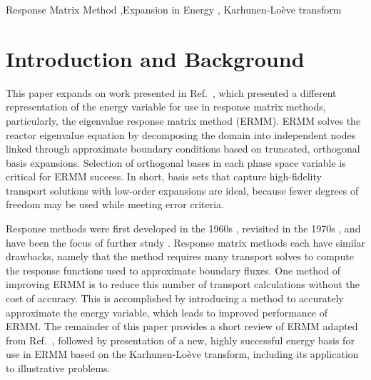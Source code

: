 \documentclass[5p,times,twocolumn,10pt]{elsarticle}
\newcommand{\REF}[1]{Ref.~\citen{#1}}               %
\begin{document}
\begin{frontmatter}
        \begin{keyword}
            Response Matrix Method \sep Expansion in Energy \sep 
            Karhunen-Lo\`{e}ve transform
            
            
            
        \end{keyword}
        
    \end{frontmatter}
    
    
    \section{Introduction and Background}
    \label{Introduction}
    
    This paper expands on work presented in \REF{annualANS}, which 
    presented a different representation of the energy variable for use in 
    response matrix methods, particularly, the eigenvalue response matrix 
    method (ERMM). ERMM solves the reactor eigenvalue equation by decomposing 
    the domain into independent nodes linked through approximate boundary 
    conditions based on truncated, orthogonal basis expansions. Selection of 
    orthogonal bases in each phase space variable is critical for ERMM success.  
    In short, basis sets that capture high-fidelity transport solutions with 
    low-order expansions are ideal, because fewer degrees of freedom may be 
    used while meeting error criteria. 

    Response methods were first developed in the 1960s \cite{shimizu, 
shimizu_et_all}, revisited in the     1970s \cite{Lindahl, Weiss1975}, and 
have been the focus of further study \cite{RobertsSerment, 
Mosher2006}.  Response matrix methods each have 
    similar drawbacks, namely that the method requires many transport solves to 
    compute the response functions used to approximate boundary fluxes.  One 
    method of improving ERMM is to reduce this number of transport calculations 
    without the cost of accuracy. This is accomplished by introducing a method 
    to accurately approximate the energy variable, which leads to improved 
    performance of ERMM. The remainder of this paper provides a short review of 
    ERMM adapted from \REF{RobertsSerment}, followed by presentation of a new, 
    highly successful energy basis for use in ERMM based on the 
    Karhunen-Lo\`{e}ve transform, including its application to 
    illustrative problems. 
    
\end{document}
